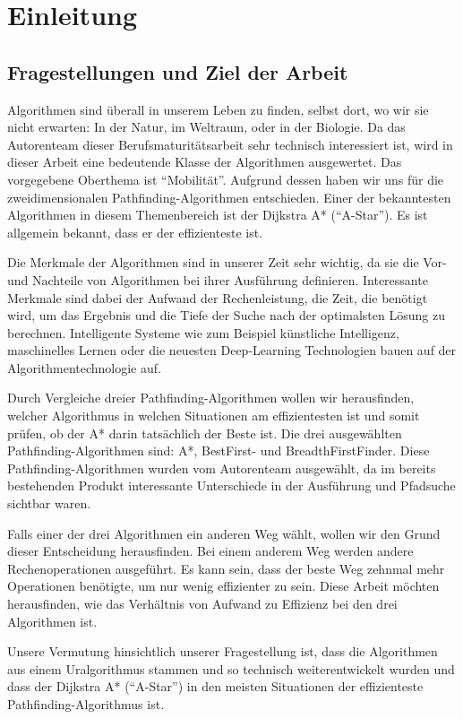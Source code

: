 \chapter{Einleitung}
\section{Fragestellungen und Ziel der Arbeit}
Algorithmen sind überall in unserem Leben zu finden, selbst dort, wo wir sie nicht erwarten: In der Natur, im Weltraum, oder in der Biologie. Da das Autorenteam dieser Berufsmaturitätsarbeit sehr technisch interessiert ist, wird in dieser Arbeit eine bedeutende Klasse der Algorithmen ausgewertet. Das vorgegebene Oberthema ist ``Mobilität''. Aufgrund dessen haben wir uns für die zweidimensionalen Pathfinding-Algorithmen entschieden. Einer der bekanntesten Algorithmen in diesem Themenbereich ist der Dijkstra A* (``A-Star''). Es ist allgemein bekannt, dass er der effizienteste ist. \cite[Andrew Walker, StackOverflow, 2012]{isastarbest}

Die Merkmale der Algorithmen sind in unserer Zeit sehr wichtig, da sie die Vor- und Nachteile von Algorithmen bei ihrer Ausführung definieren. Interessante Merkmale sind dabei der Aufwand der Rechenleistung, die Zeit, die benötigt wird, um das Ergebnis und die Tiefe der Suche nach der optimalsten Lösung zu berechnen. Intelligente Systeme wie zum Beispiel künstliche Intelligenz, maschinelles Lernen oder die neuesten Deep-Learning Technologien bauen auf der Algorithmentechnologie auf.


Durch Vergleiche dreier Pathfinding-Algorithmen wollen wir herausfinden, welcher Algorithmus in welchen Situationen am effizientesten ist und somit prüfen, ob der A* darin tatsächlich der Beste ist. Die drei ausgewählten Pathfinding-Algorithmen sind: A*, BestFirst- und BreadthFirstFinder. Diese Pathfinding-Algorithmen wurden vom Autorenteam ausgewählt, da im bereits bestehenden Produkt interessante Unterschiede in der Ausführung und Pfadsuche sichtbar waren.


Falls einer der drei Algorithmen ein anderen Weg wählt, wollen wir den Grund dieser Entscheidung herausfinden. Bei einem anderem Weg werden andere Rechenoperationen ausgeführt. Es kann sein, dass der beste Weg zehnmal mehr Operationen benötigte, um nur wenig effizienter zu sein. Diese Arbeit möchten herausfinden, wie das Verhältnis von Aufwand zu Effizienz bei den drei Algorithmen ist.


Unsere Vermutung hinsichtlich unserer Fragestellung ist, dass die Algorithmen aus einem Uralgorithmus stammen und so technisch weiterentwickelt wurden und dass der Dijkstra A* (``A-Star'') in den meisten Situationen der effizienteste Pathfinding-Algorithmus ist. \cite[Andrew Walker, StackOverflow, 2012]{isastarbest}

